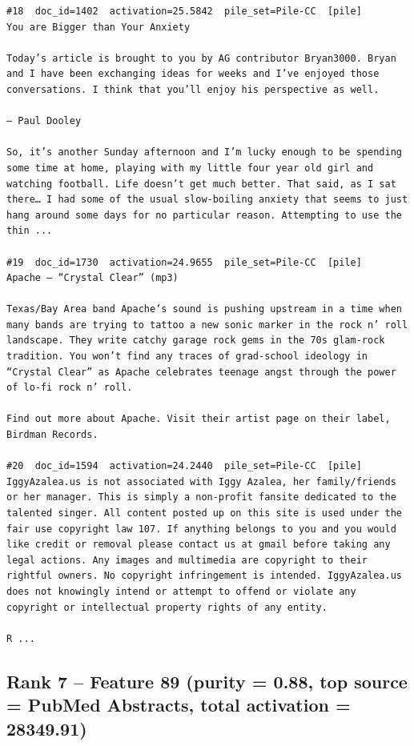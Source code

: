 \begin{verbatim}
#18  doc_id=1402  activation=25.5842  pile_set=Pile-CC  [pile]
You are Bigger than Your Anxiety

Today’s article is brought to you by AG contributor Bryan3000. Bryan and I have been exchanging ideas for weeks and I’ve enjoyed those conversations. I think that you’ll enjoy his perspective as well.

— Paul Dooley

So, it’s another Sunday afternoon and I’m lucky enough to be spending some time at home, playing with my little four year old girl and watching football. Life doesn’t get much better. That said, as I sat there… I had some of the usual slow-boiling anxiety that seems to just hang around some days for no particular reason. Attempting to use the thin ...

#19  doc_id=1730  activation=24.9655  pile_set=Pile-CC  [pile]
Apache – “Crystal Clear” (mp3)

Texas/Bay Area band Apache‘s sound is pushing upstream in a time when many bands are trying to tattoo a new sonic marker in the rock n’ roll landscape. They write catchy garage rock gems in the 70s glam-rock tradition. You won’t find any traces of grad-school ideology in “Crystal Clear” as Apache celebrates teenage angst through the power of lo-fi rock n’ roll.

Find out more about Apache. Visit their artist page on their label, Birdman Records.

#20  doc_id=1594  activation=24.2440  pile_set=Pile-CC  [pile]
IggyAzalea.us is not associated with Iggy Azalea, her family/friends or her manager. This is simply a non-profit fansite dedicated to the talented singer. All content posted up on this site is used under the fair use copyright law 107. If anything belongs to you and you would like credit or removal please contact us at gmail before taking any legal actions. Any images and multimedia are copyright to their rightful owners. No copyright infringement is intended. IggyAzalea.us does not knowingly intend or attempt to offend or violate any copyright or intellectual property rights of any entity.

R ...

\end{verbatim}

\subsection*{Rank 7 -- Feature 89 (purity = 0.88, top source = PubMed Abstracts, total activation = 28349.91)}


